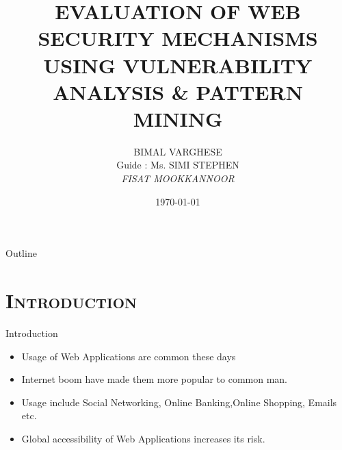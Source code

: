 \documentclass[xcolor=x11names,compress]{beamer}
\renewcommand{\(}{\begin{columns}}
\renewcommand{\)}{\end{columns}}
\newcommand{\<}[1]{\begin{column}{#1}}
\renewcommand{\>}{\end{column}}
\begin{document}

\begin{frame}
\title{EVALUATION OF WEB SECURITY MECHANISMS
	USING VULNERABILITY ANALYSIS \& PATTERN
	MINING}
\author{
	BIMAL VARGHESE\\
	\vspace{.2cm}
	Guide : Ms. SIMI STEPHEN\\\vspace{.2cm}
	{\it FISAT MOOKKANNOOR}\\
	\vspace{.3cm}
}
\date{
	\vspace{.5cm}
	\today
}
\titlepage
\end{frame}

\begin{frame}{Outline}
\tableofcontents
\end{frame}

\section{\scshape Introduction}
\begin{frame}{Introduction}
	\begin{itemize}
		\item  Usage of Web Applications are common these days
		\newline
		\item Internet boom have made them more popular to common man.
		\newline
		\item Usage include Social Networking, Online Banking,Online Shopping, Emails etc.
		\newline
		\item Global accessibility of  Web Applications increases its risk.
					
	\end{itemize}
	
\end{frame}
\end{document}
